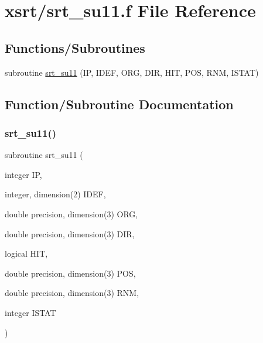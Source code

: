 \hypertarget{srt__su11_8f}{}\section{xsrt/srt\+\_\+su11.f File Reference}
\label{srt__su11_8f}
\subsection*{Functions/\+Subroutines}
\begin{DoxyCompactItemize}
\item 
subroutine \hyperlink{srt__su11_8f_afac577dacf81a1a16c07eefbdf49c835}{srt\+\_\+su11} (IP, I\+D\+EF, O\+RG, D\+IR, H\+IT, P\+OS, R\+NM, I\+S\+T\+AT)
\end{DoxyCompactItemize}


\subsection{Function/\+Subroutine Documentation}
\mbox{\label{srt__su11_8f_afac577dacf81a1a16c07eefbdf49c835}} 
\subsubsection{\texorpdfstring{srt\+\_\+su11()}{srt\_su11()}}
{\footnotesize\ttfamily subroutine srt\+\_\+su11 (\begin{DoxyParamCaption}\item[{integer}]{IP,  }\item[{integer, dimension(2)}]{I\+D\+EF,  }\item[{double precision, dimension(3)}]{O\+RG,  }\item[{double precision, dimension(3)}]{D\+IR,  }\item[{logical}]{H\+IT,  }\item[{double precision, dimension(3)}]{P\+OS,  }\item[{double precision, dimension(3)}]{R\+NM,  }\item[{integer}]{I\+S\+T\+AT }\end{DoxyParamCaption})}

